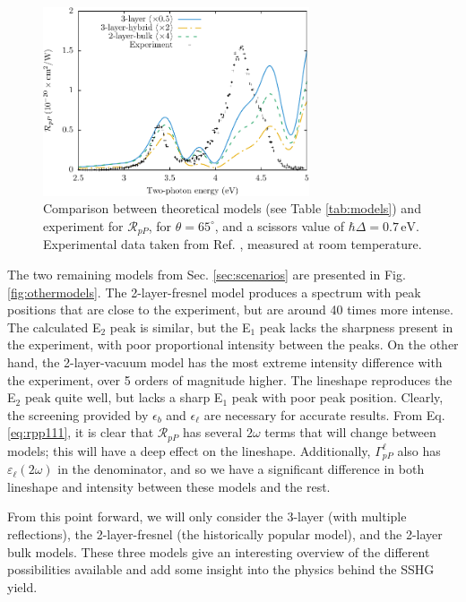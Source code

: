 \begin{figure}[H]
\centering 
\includegraphics[width=0.7\textwidth]{content/figures/fig-Si1x1-Mejia_RpP}
\caption{Comparison between theoretical models (see Table \ref{tab:models}) and
experiment for $\mathcal{R}_{pP}$, for $\theta=65^{\circ}$, and a scissors value
of $\hbar\Delta = 0.7\,\text{eV}$. Experimental data taken from Ref. 
\cite{mejiaPRB02}, measured at room temperature.}
\label{fig:RpP}
\end{figure}

The two remaining models from Sec. \ref{sec:scenarios} are presented in Fig.
\ref{fig:othermodels}. The 2-layer-fresnel model produces a spectrum with peak
positions that are close to the experiment, but are around 40 times more
intense. The calculated E$_{2}$ peak is similar, but the E$_{1}$ peak lacks the
sharpness present in the experiment, with poor proportional intensity between
the peaks. On the other hand, the 2-layer-vacuum model has the most extreme
intensity difference with the experiment, over 5 orders of magnitude higher. The
lineshape reproduces the E$_{2}$ peak quite well, but lacks a sharp E$_{1}$ peak
with poor peak position. Clearly, the screening provided by $\epsilon_{b}$ and
$\epsilon_{\ell}$ are necessary for accurate results. From Eq.
\eqref{eq:rpp111}, it is clear that $\mathcal{R}_{pP}$ has several $2\omega$
terms that will change between models; this will have a deep effect on the
lineshape. Additionally, $\Gamma^{\ell}_{pP}$ also has
$\varepsilon_{\ell}(2\omega)$ in the denominator, and so we have a significant
difference in both lineshape and intensity between these models and the rest.

From this point forward, we will only consider the 3-layer (with multiple
reflections), the 2-layer-fresnel (the historically popular model), and the
2-layer bulk models. These three models give an interesting overview of the
different possibilities available and add some insight into the physics behind
the SSHG yield.

